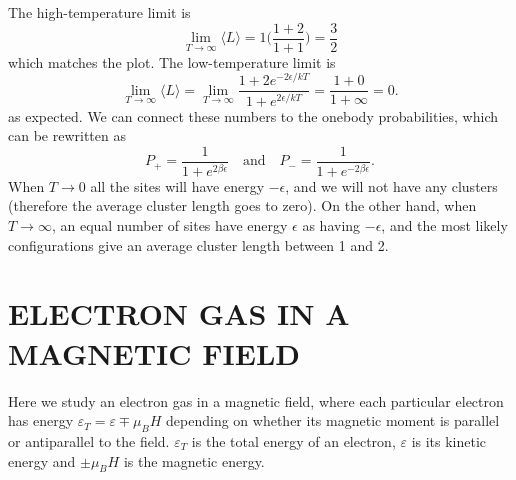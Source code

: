 \documentclass[norsk,a4paper,12pt]{article}
\begin{document}
The high-temperature limit is
\begin{equation}
\lim_{T\rightarrow\infty}\langle L\rangle = 1\bigg(\frac{1+2}{1+1}\bigg)=\frac{3}{2}
\end{equation}
which matches the plot. The low-temperature limit is
\begin{equation}
\lim_{T\rightarrow\infty}\langle L\rangle = \lim_{T\rightarrow\infty} \frac{1+2e^{-2\epsilon/kT}}{1+e^{2\epsilon/kT}}=\frac{1+0}{1+\infty}=0.
\end{equation}
as expected. We can connect these numbers to the onebody probabilities, which can be rewritten as
\begin{equation}
P_+=\frac{1}{1+e^{2\beta\epsilon}}\quad\text{and}\quad P_-=\frac{1}{1+e^{-2\beta\epsilon}}.
\end{equation}
When $T\rightarrow 0$ all the sites will have energy $-\epsilon$, and we will not have any clusters (therefore the average cluster length goes to zero). On the other hand, when $T\rightarrow\infty$, an equal number of sites have energy $\epsilon$ as having $-\epsilon$, and the most likely configurations give an average cluster length between 1 and 2.

\newpage
\section{ELECTRON GAS IN A MAGNETIC FIELD}
Here we study an electron gas in a magnetic field, where each particular electron has energy $\varepsilon_T=\varepsilon\mp\mu_BH$ depending on whether its magnetic moment is parallel or antiparallel to the field. $\varepsilon_T$ is the total energy of an electron, $\varepsilon$ is its kinetic energy and $\pm\mu_BH$ is the magnetic energy. 
\end{document}

